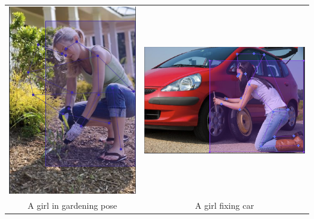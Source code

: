 \documentclass[a4paper,12pt]{article}
\begin{document}
\begin{center}
\begin{tabular}{cc}
\includegraphics[scale=0.2]{Shreyas_gardening.png}
&
\includegraphics[scale=0.3]{Shreyas_Hand_labelled.png}
\\
A girl in gardening pose & A girl fixing car
\end{tabular}
\end{center}
\end{document}
